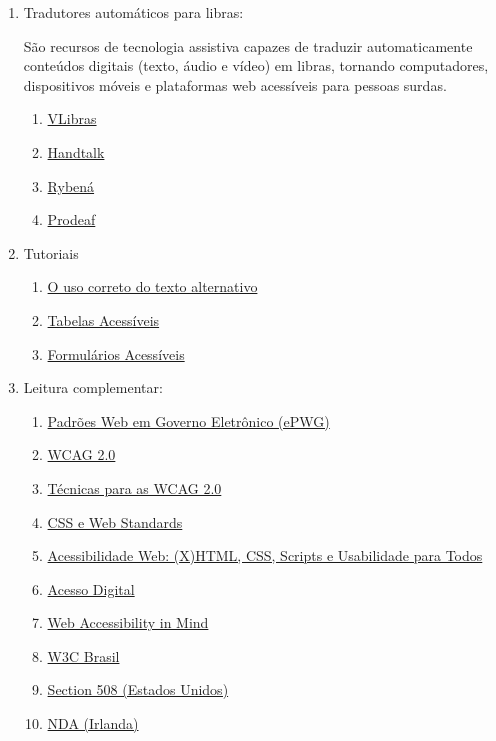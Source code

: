 \documentclass[
  12pt,
  openright,
  twoside,
  a4paper,
  english,
  french,
  spanish,
  brazil
]{abntex2}
\begin{document}
\begin{enumerate}
  \item Tradutores automáticos para libras:

  São recursos de tecnologia assistiva capazes de traduzir automaticamente
  conteúdos digitais (texto, áudio e vídeo) em libras, tornando computadores,
  dispositivos móveis e plataformas web acessíveis para pessoas surdas.

  \begin{enumerate}
    \item \href{http://www.vlibras.gov.br}{VLibras}
    \item \href{http://www.handtalk.me}{Handtalk}
    \item \href{https://rybena.com.br}{Rybená}
    \item \href{http://www.prodeaf.net}{Prodeaf}
  \end{enumerate}
  \item Tutoriais
  \begin{enumerate}
    \item \href{https://www.gov.br/governodigital/pt-br/acessibilidade-e-usuario/acessibilidade-digital/uso-correto-texto-alternativo.pdf}{O uso correto do texto alternativo}
    \item \href{https://www.gov.br/governodigital/pt-br/acessibilidade-e-usuario/acessibilidade-digital/tabelas-acessiveis.pdf}{Tabelas Acessíveis}
    \item \href{https://www.gov.br/governodigital/pt-br/acessibilidade-e-usuario/acessibilidade-digital/formularios-acessiveis.pdf}{Formulários Acessíveis}
  \end{enumerate}
  \item Leitura complementar:
  \begin{enumerate}
    \item \href{https://www.gov.br/governodigital/pt-br/acessibilidade-e-usuario/acessibilidade-digital/padroes-web-em-governo-eletronico}{Padrões Web em Governo Eletrônico (ePWG)}
    \item \href{https://www.w3.org/TR/WCAG20}{WCAG 2.0}
    \item \href{https://www.w3.org/TR/WCAG20-TECHS}{Técnicas para as WCAG 2.0}
    \item \href{http://maujor.com}{CSS e Web Standards}
    \item \href{http://www.acessibilidadelegal.com}{Acessibilidade Web: (X)HTML, CSS, Scripts e Usabilidade para Todos}
    \item \href{http://www.acessodigital.net}{Acesso Digital}
    \item \href{http://webaim.org}{Web Accessibility in Mind}
    \item \href{http://w3c.br}{W3C Brasil}
    \item \href{http://www.section508.gov}{Section 508 (Estados Unidos)}
    \item \href{http://www.nda.ie/cntmgmtnew.nsf}{NDA (Irlanda)}
  \end{enumerate}
\end{enumerate}
\end{document}
